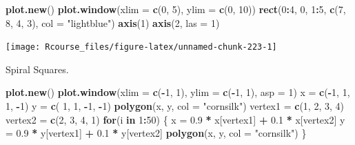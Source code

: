 \documentclass[]{book}
\newenvironment{Shaded}{\begin{snugshade}}{\end{snugshade}}
\newcommand{\KeywordTok}[1]{\textcolor[rgb]{0.13,0.29,0.53}{\textbf{#1}}}
\newcommand{\DataTypeTok}[1]{\textcolor[rgb]{0.13,0.29,0.53}{#1}}
\newcommand{\DecValTok}[1]{\textcolor[rgb]{0.00,0.00,0.81}{#1}}
\newcommand{\FloatTok}[1]{\textcolor[rgb]{0.00,0.00,0.81}{#1}}
\newcommand{\StringTok}[1]{\textcolor[rgb]{0.31,0.60,0.02}{#1}}
\newcommand{\ControlFlowTok}[1]{\textcolor[rgb]{0.13,0.29,0.53}{\textbf{#1}}}
\newcommand{\OperatorTok}[1]{\textcolor[rgb]{0.81,0.36,0.00}{\textbf{#1}}}
\newcommand{\NormalTok}[1]{#1}
\theoremstyle{definition}
\theoremstyle{definition}
\theoremstyle{definition}
\theoremstyle{remark}
\begin{document}
\begin{Shaded}
\begin{Highlighting}[]
\KeywordTok{plot.new}\NormalTok{()}
\KeywordTok{plot.window}\NormalTok{(}\DataTypeTok{xlim =} \KeywordTok{c}\NormalTok{(}\DecValTok{0}\NormalTok{, }\DecValTok{5}\NormalTok{), }\DataTypeTok{ylim =} \KeywordTok{c}\NormalTok{(}\DecValTok{0}\NormalTok{, }\DecValTok{10}\NormalTok{))}
\KeywordTok{rect}\NormalTok{(}\DecValTok{0}\OperatorTok{:}\DecValTok{4}\NormalTok{, }\DecValTok{0}\NormalTok{, }\DecValTok{1}\OperatorTok{:}\DecValTok{5}\NormalTok{, }\KeywordTok{c}\NormalTok{(}\DecValTok{7}\NormalTok{, }\DecValTok{8}\NormalTok{, }\DecValTok{4}\NormalTok{, }\DecValTok{3}\NormalTok{), }\DataTypeTok{col =} \StringTok{"lightblue"}\NormalTok{)}
\KeywordTok{axis}\NormalTok{(}\DecValTok{1}\NormalTok{)}
\KeywordTok{axis}\NormalTok{(}\DecValTok{2}\NormalTok{, }\DataTypeTok{las =} \DecValTok{1}\NormalTok{)}
\end{Highlighting}
\end{Shaded}

\texttt{[image: Rcourse\_files/figure-latex/unnamed-chunk-223-1]}

Spiral Squares.

\begin{Shaded}
\begin{Highlighting}[]
\KeywordTok{plot.new}\NormalTok{()}
\KeywordTok{plot.window}\NormalTok{(}\DataTypeTok{xlim =} \KeywordTok{c}\NormalTok{(}\OperatorTok{-}\DecValTok{1}\NormalTok{, }\DecValTok{1}\NormalTok{), }\DataTypeTok{ylim =} \KeywordTok{c}\NormalTok{(}\OperatorTok{-}\DecValTok{1}\NormalTok{, }\DecValTok{1}\NormalTok{), }\DataTypeTok{asp =} \DecValTok{1}\NormalTok{)}
\NormalTok{x =}\StringTok{ }\KeywordTok{c}\NormalTok{(}\OperatorTok{-}\DecValTok{1}\NormalTok{, }\DecValTok{1}\NormalTok{, }\DecValTok{1}\NormalTok{, }\OperatorTok{-}\DecValTok{1}\NormalTok{)}
\NormalTok{y =}\StringTok{ }\KeywordTok{c}\NormalTok{( }\DecValTok{1}\NormalTok{, }\DecValTok{1}\NormalTok{, }\OperatorTok{-}\DecValTok{1}\NormalTok{, }\OperatorTok{-}\DecValTok{1}\NormalTok{)}
\KeywordTok{polygon}\NormalTok{(x, y, }\DataTypeTok{col =} \StringTok{"cornsilk"}\NormalTok{)}
\NormalTok{vertex1 =}\StringTok{ }\KeywordTok{c}\NormalTok{(}\DecValTok{1}\NormalTok{, }\DecValTok{2}\NormalTok{, }\DecValTok{3}\NormalTok{, }\DecValTok{4}\NormalTok{)}
\NormalTok{vertex2 =}\StringTok{ }\KeywordTok{c}\NormalTok{(}\DecValTok{2}\NormalTok{, }\DecValTok{3}\NormalTok{, }\DecValTok{4}\NormalTok{, }\DecValTok{1}\NormalTok{)}
\ControlFlowTok{for}\NormalTok{(i }\ControlFlowTok{in} \DecValTok{1}\OperatorTok{:}\DecValTok{50}\NormalTok{) \{}
\NormalTok{    x =}\StringTok{ }\FloatTok{0.9} \OperatorTok{*}\StringTok{ }\NormalTok{x[vertex1] }\OperatorTok{+}\StringTok{ }\FloatTok{0.1} \OperatorTok{*}\StringTok{ }\NormalTok{x[vertex2]}
\NormalTok{    y =}\StringTok{ }\FloatTok{0.9} \OperatorTok{*}\StringTok{ }\NormalTok{y[vertex1] }\OperatorTok{+}\StringTok{ }\FloatTok{0.1} \OperatorTok{*}\StringTok{ }\NormalTok{y[vertex2]}
    \KeywordTok{polygon}\NormalTok{(x, y, }\DataTypeTok{col =} \StringTok{"cornsilk"}\NormalTok{)}
\NormalTok{\}}
\end{Highlighting}
\end{Shaded}
\end{document}
